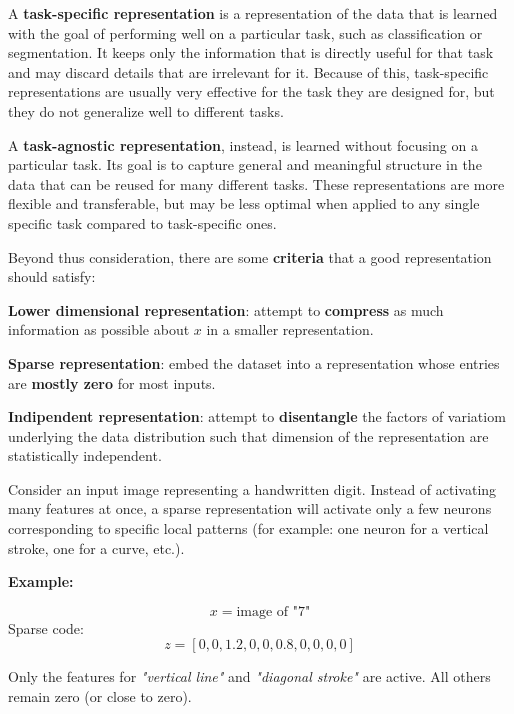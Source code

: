 \begin{infobox}
    A \textbf{task-specific representation} is a representation of the data that is learned with the goal of performing well on a particular task, such as classification or segmentation. It keeps only the information that is directly useful for that task and may discard details that are irrelevant for it. Because of this, task-specific representations are usually very effective for the task they are designed for, but they do not generalize well to different tasks.

    A \textbf{task-agnostic representation}, instead, is learned without focusing on a particular task. Its goal is to capture general and meaningful structure in the data that can be reused for many different tasks. These representations are more flexible and transferable, but may be less optimal when applied to any single specific task compared to task-specific ones.
\end{infobox}

Beyond thus consideration, there are some \textbf{criteria} that a good representation should satisfy:
\begin{compactitemize}
    \item \textbf{Lower dimensional representation}: attempt to \textbf{compress} as much information as possible about $x$ in a smaller representation.
    \item \textbf{Sparse representation}: embed the dataset into a representation whose entries are \textbf{mostly zero} for most inputs.
    \item \textbf{Indipendent representation}: attempt to \textbf{disentangle} the factors of variatiom underlying the data distribution such that dimension of the representation are statistically independent.
\end{compactitemize}

\begin{infobox}
    Consider an input image representing a handwritten digit. Instead of activating many features at once, a sparse representation will activate only a few neurons corresponding to specific local patterns (for example: one neuron for a vertical stroke, one for a curve, etc.). 
    
    \textbf{Example:}
    
    \[
    x = \text{image of "7"}
    \]
    Sparse code:
    \[
    z = [0, 0, 1.2, 0, 0, 0.8, 0, 0, 0, 0]
    \]
    
    Only the features for \textit{"vertical line"} and \textit{"diagonal stroke"} are active. All others remain zero (or close to zero).
\end{infobox}

